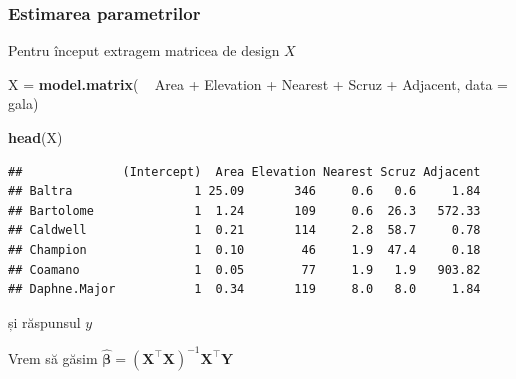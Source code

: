 \documentclass[]{article}
\newenvironment{Shaded}{\begin{snugshade}}{\end{snugshade}}
\newcommand{\KeywordTok}[1]{\textcolor[rgb]{0.13,0.29,0.53}{\textbf{{#1}}}}
\newcommand{\DataTypeTok}[1]{\textcolor[rgb]{0.13,0.29,0.53}{{#1}}}
\newcommand{\StringTok}[1]{\textcolor[rgb]{0.31,0.60,0.02}{{#1}}}
\newcommand{\CommentTok}[1]{\textcolor[rgb]{0.56,0.35,0.01}{\textit{{#1}}}}
\newcommand{\NormalTok}[1]{{#1}}
\begin{document}
\subsubsection{Estimarea parametrilor}\label{estimarea-parametrilor}

Pentru început extragem matricea de design \(X\)

\begin{Shaded}
\begin{Highlighting}[]
\NormalTok{X =}\StringTok{ }\KeywordTok{model.matrix}\NormalTok{( ~}\StringTok{ }\NormalTok{Area +}\StringTok{ }\NormalTok{Elevation +}\StringTok{ }\NormalTok{Nearest +}\StringTok{ }\NormalTok{Scruz +}\StringTok{ }\NormalTok{Adjacent, }
    \DataTypeTok{data =} \NormalTok{gala)}

\KeywordTok{head}\NormalTok{(X)}
\end{Highlighting}
\end{Shaded}

\begin{verbatim}
##              (Intercept)  Area Elevation Nearest Scruz Adjacent
## Baltra                 1 25.09       346     0.6   0.6     1.84
## Bartolome              1  1.24       109     0.6  26.3   572.33
## Caldwell               1  0.21       114     2.8  58.7     0.78
## Champion               1  0.10        46     1.9  47.4     0.18
## Coamano                1  0.05        77     1.9   1.9   903.82
## Daphne.Major           1  0.34       119     8.0   8.0     1.84
\end{verbatim}

și răspunsul \(y\)

\begin{Shaded}
\end{Shaded}

Vrem să găsim
\(\hat{\boldsymbol{\beta}}=(\mathbf{X}^\intercal\mathbf{X})^{-1}\mathbf{X}^\intercal\mathbf{Y}\)

\begin{Shaded}
\end{Shaded}
\end{document}
